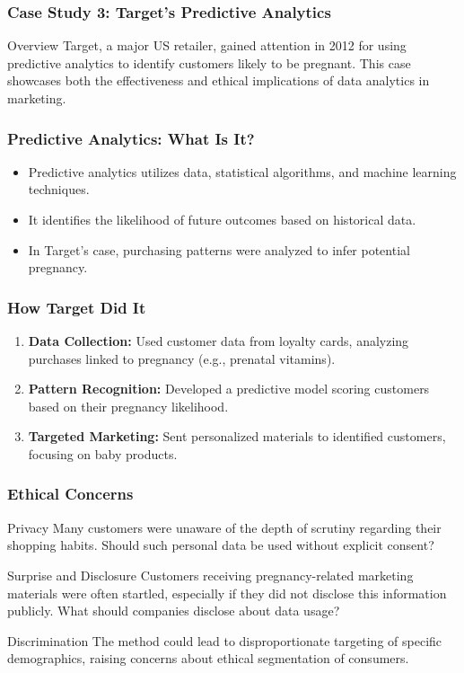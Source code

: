 \documentclass[aspectratio=169]{beamer}
\begin{document}
\begin{frame}[fragile]
    \frametitle{Case Study 3: Target's Predictive Analytics}
    \begin{block}{Overview}
        Target, a major US retailer, gained attention in 2012 for using predictive analytics to identify customers likely to be pregnant. This case showcases both the effectiveness and ethical implications of data analytics in marketing.
    \end{block}
\end{frame}

\begin{frame}[fragile]
    \frametitle{Predictive Analytics: What Is It?}
    \begin{itemize}
        \item Predictive analytics utilizes data, statistical algorithms, and machine learning techniques.
        \item It identifies the likelihood of future outcomes based on historical data.
        \item In Target's case, purchasing patterns were analyzed to infer potential pregnancy.
    \end{itemize}
\end{frame}

\begin{frame}[fragile]
    \frametitle{How Target Did It}
    \begin{enumerate}
        \item \textbf{Data Collection:} Used customer data from loyalty cards, analyzing purchases linked to pregnancy (e.g., prenatal vitamins).
        \item \textbf{Pattern Recognition:} Developed a predictive model scoring customers based on their pregnancy likelihood.
        \item \textbf{Targeted Marketing:} Sent personalized materials to identified customers, focusing on baby products.
    \end{enumerate}
\end{frame}

\begin{frame}[fragile]
    \frametitle{Ethical Concerns}
    \begin{block}{Privacy}
        Many customers were unaware of the depth of scrutiny regarding their shopping habits. Should such personal data be used without explicit consent?
    \end{block}
    
    \begin{block}{Surprise and Disclosure}
        Customers receiving pregnancy-related marketing materials were often startled, especially if they did not disclose this information publicly. What should companies disclose about data usage?
    \end{block}
    
    \begin{block}{Discrimination}
        The method could lead to disproportionate targeting of specific demographics, raising concerns about ethical segmentation of consumers.
    \end{block}
\end{frame}
\end{document}
